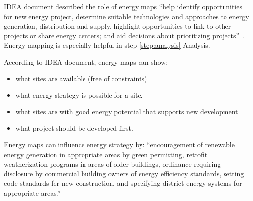 \documentclass[hidelinks,12pt]{article}
\begin{document}
IDEA document described the role of energy maps ``help identify
opportunities for new energy project, determine suitable technologies
and approaches to energy generation, distribution and supply,
highlight opportunities to link to other projects or share energy
centers; and aid decisions about prioritizing
projects''~\cite{IDEA2012}. Energy mapping is especially helpful in
step \ref{step:analysis} Analysis.

According to IDEA document, energy maps can show:
\begin{itemize}
\item what sites are available (free of constraints)
\item what energy strategy is possible for a site.
\item what sites are with good energy potential that supports new
  development
\item what project should be developed first.
\end{itemize}

Energy maps can influence energy strategy by: ``encouragement of
renewable energy generation in appropriate areas by green permitting,
retrofit weatherization programs in areas of older buildings,
ordinance requiring disclosure by commercial building owners of energy
efficiency standards, setting code standards for new construction, and
specifying district energy systems for appropriate
areas.''~\cite{IDEA2012}
\newpage


\end{document}
